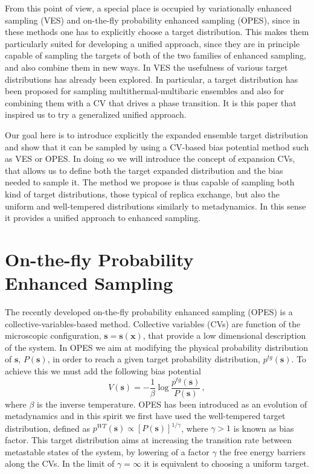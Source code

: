 \documentclass[aps,prx,reprint,superscriptaddress]{revtex4-1} %
\begin{document}
From this point of view, a special place is occupied by variationally enhanced sampling (VES)\cite{Valsson2014} and on-the-fly probability enhanced sampling (OPES)\cite{Invernizzi2020}, since in these methods one has to explicitly choose a target distribution.
This makes them particularly suited for developing a unified approach, since they are in principle capable of sampling the targets of both of the two families of enhanced sampling, and also combine them in new ways.
In VES the usefulness of various target distributions has already been explored\cite{Shaffer2016,Invernizzi2017,Debnath2019}.
In particular, a target distribution has been proposed for sampling multithermal-multibaric ensembles\cite{Piaggi2019} and also for combining them with a CV that drives a phase transition\cite{Piaggi2019cv}. 
It is this paper that inspired us to try a generalized unified approach.

Our goal here is to introduce explicitly the expanded ensemble target distribution and show that it can be sampled by using a CV-based bias potential method such as VES or OPES.
In doing so we will introduce the concept of expansion CVs, that allows us to define both the target expanded distribution and the bias needed to sample it.
The method we propose is thus capable of sampling both kind of target distributions, those typical of replica exchange, but also the uniform and well-tempered distributions similarly to metadynamics.
In this sense it provides a unified approach to enhanced sampling.


\section{On-the-fly Probability\\Enhanced Sampling\label{S:opes}}
The recently developed on-the-fly probability enhanced sampling (OPES)\cite{Invernizzi2020} is a collective-variables-based method.
Collective variables (CVs) are function of the microscopic configuration, $\mathbf{s}=\mathbf{s}(\mathbf{x})$, that provide a low dimensional description of the system.
In OPES we aim at modifying the physical probability distribution of $\mathbf{s}$, $P(\mathbf{s})$, in order to reach a given target probability distribution, $p^{tg}(\mathbf{s})$.
To achieve this we must add the following bias potential
\begin{equation}\label{E:opes_bias}
    V(\mathbf{s})=-\frac{1}{\beta}\log \frac{p^{tg}(\mathbf{s})}{P(\mathbf{s})}\, ,
\end{equation}
where $\beta$ is the inverse temperature.
OPES has been introduced as an evolution of metadynamics and in this spirit we first have used the well-tempered target distribution, defined as $p^{WT}(\mathbf{s})\propto [P(\mathbf{s})]^{1/\gamma}$, where $\gamma>1$ is known as bias factor.
This target distribution aims at increasing the transition rate between metastable states of the system, by lowering of a factor $\gamma$ the free energy barriers along the CVs.
In the limit of $\gamma=\infty$ it is equivalent to choosing a uniform target.
\end{document}
